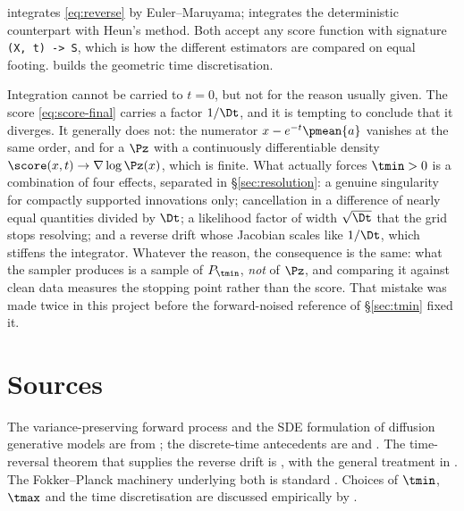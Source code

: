 \begin{codebox}
 integrates \eqref{eq:reverse} by Euler--Maruyama;
 integrates the deterministic counterpart
with Heun's method. Both accept any score function with signature \texttt{(X, t) -> S}, which
is how the different estimators are compared on equal footing.
 builds the geometric time discretisation.
\end{codebox}

\begin{pitfall}
Integration cannot be carried to $t=0$, but not for the reason usually given. The score
\eqref{eq:score-final} carries a factor $1/\Dt$, and it is tempting to conclude that it
diverges. It generally does not: the numerator $x - e^{-t}\pmean{a}$ vanishes at the same
order, and for a $\Pz$ with a continuously differentiable density
$\score(x,t)\to\nabla\log\Pz(x)$, which is finite. What actually forces $\tmin>0$ is a
combination of four effects, separated in \S\ref{sec:resolution}: a genuine singularity for
compactly supported innovations only; cancellation in a difference of nearly equal
quantities divided by $\Dt$; a likelihood factor of width $\sqrt{\Dt}$ that the grid stops
resolving; and a reverse drift whose Jacobian scales like $1/\Dt$, which stiffens the
integrator. Whatever the reason, the consequence is the same: what the sampler produces is a
sample of $P_{\tmin}$, \emph{not} of $\Pz$, and comparing it against clean data measures the
stopping point rather than the score. That mistake was made twice in this project before the
forward-noised reference of \S\ref{sec:tmin} fixed it.
\end{pitfall}

\section*{Sources}
The variance-preserving forward process and the SDE formulation of diffusion generative models
are from \citet{song2021scorebased}; the discrete-time antecedents are \citet{sohl2015deep} and
\citet{ho2020denoising}. The time-reversal theorem that supplies the reverse drift is
\citet{anderson1982reverse}, with the general treatment in \citet{haussmann1986}. The Fokker--Planck
machinery underlying both is standard \citep{risken1989}. Choices of $\tmin$, $\tmax$ and the
time discretisation are discussed empirically by \citet{karras2022elucidating}.

